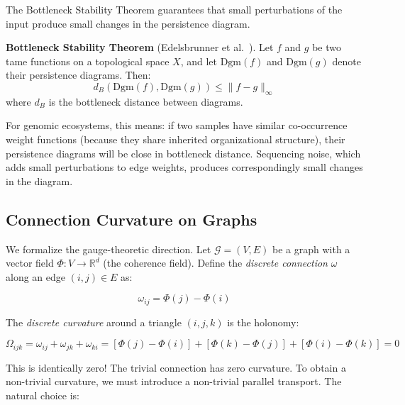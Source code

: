 \documentclass{../yalumba}
\begin{document}
The Bottleneck Stability Theorem guarantees that small perturbations of
the input produce small changes in the persistence diagram.

\begin{definition}
\textbf{Bottleneck Stability Theorem}
(Edelsbrunner et al.~\cite{edelsbrunner2010computational}).  Let $f$
and $g$ be two tame functions on a topological space $X$, and let
$\mathrm{Dgm}(f)$ and $\mathrm{Dgm}(g)$ denote their persistence
diagrams.  Then:
\begin{equation}
  d_B(\mathrm{Dgm}(f), \mathrm{Dgm}(g)) \leq \|f - g\|_\infty
  \label{eq:bottleneck_stability}
\end{equation}
where $d_B$ is the bottleneck distance between diagrams.
\end{definition}

For genomic ecosystems, this means: if two samples have similar
co-occurrence weight functions (because they share inherited
organizational structure), their persistence diagrams will be close in
bottleneck distance.  Sequencing noise, which adds small perturbations
to edge weights, produces correspondingly small changes in the diagram.

\subsection{Connection Curvature on Graphs}
\label{sec:math:connection}

We formalize the gauge-theoretic direction.  Let $\mathcal{G} = (V, E)$
be a graph with a vector field $\Phi: V \to \mathbb{R}^d$ (the
coherence field).  Define the \emph{discrete connection} $\omega$ along
an edge $(i, j) \in E$ as:

\begin{equation}
  \omega_{ij} = \Phi(j) - \Phi(i)
  \label{eq:discrete_connection}
\end{equation}

The \emph{discrete curvature} around a triangle $(i, j, k)$ is the
holonomy:

\begin{equation}
  \Omega_{ijk} = \omega_{ij} + \omega_{jk} + \omega_{ki}
  = [\Phi(j) - \Phi(i)] + [\Phi(k) - \Phi(j)] + [\Phi(i) - \Phi(k)]
  = 0
  \label{eq:zero_curvature}
\end{equation}

This is identically zero!  The trivial connection has zero curvature.
To obtain a non-trivial curvature, we must introduce a non-trivial
parallel transport.  The natural choice is:
\end{document}
